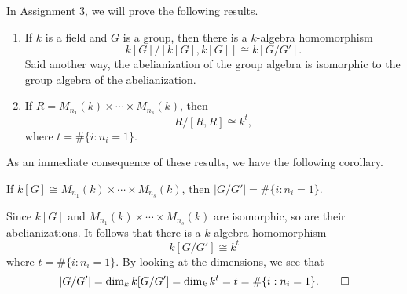 In Assignment 3, we will prove the following results. 
\begin{enumerate}[(1)]
    \item If $k$ is a field and $G$ is a group, then there is a 
    $k$-algebra homomorphism 
    \[ k[G]/[k[G], k[G]] \cong k[G/G']. \] 
    Said another way, the abelianization of the group algebra is isomorphic 
    to the group algebra of the abelianization. 
    \item If $R = M_{n_1}(k) \times \cdots \times M_{n_s}(k)$, then 
    \[ R/[R, R] \cong k^t, \] 
    where $t = \#\{i : n_i = 1\}$. 
\end{enumerate}

As an immediate consequence of these results, we have the following 
corollary. 

\begin{cor}{}
    If $k[G] \cong M_{n_1}(k) \times \cdots \times M_{n_s}(k)$, then 
    $|G/G'| = \#\{i : n_i = 1\}$. 
\end{cor}
\begin{pf}
    Since $k[G]$ and $M_{n_1}(k) \times \cdots \times M_{n_s}(k)$ 
    are isomorphic, so are their abelianizations. It follows that there 
    is a $k$-algebra homomorphism 
    \[ k[G/G'] \cong k^t \] 
    where $t = \#\{i : n_i = 1\}$. By looking at the dimensions, we see that 
    \[ |G/G'| = \dim_k k[G/G'] = \dim_k k^t = t = \#\{i : n_i = 1\}. 
    \qedhere \] 
\end{pf}

